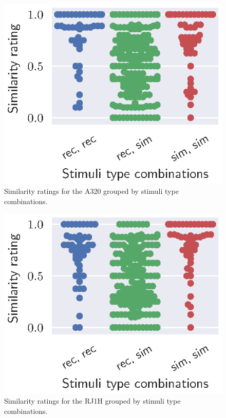 \begin{figure}[H]
  \centering
  \includegraphics[]{../figures/manual/auralisation-paper/figure3_ratings_A320}
  \caption{Similarity ratings for the A320 grouped by stimuli type combinations.}
  \label{fig:ratings_A320}
\end{figure}

\begin{figure}[H]
  \centering
  \includegraphics[]{../figures/manual/auralisation-paper/figure4_ratings_RJ1H}
  \caption{Similarity ratings for the RJ1H grouped by stimuli type combinations.}
  \label{fig:ratings_RJ1H}
\end{figure}


